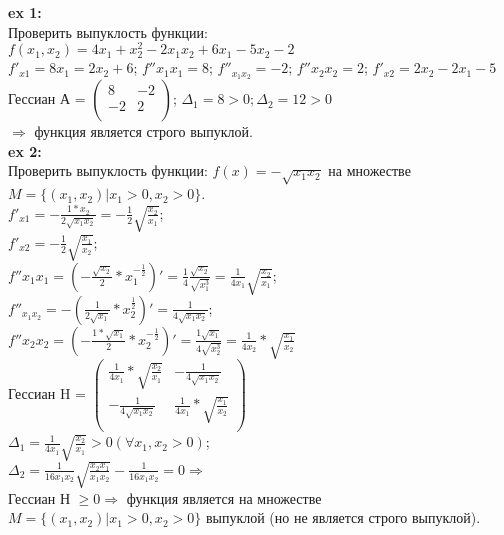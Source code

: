 \textbf{ex 1:} \\
Проверить выпуклость функции: \\
$f(x_1, x_2) = 4x_1 + x_2^2 - 2x_1x_2 + 6x_1 - 5x_2 - 2$ \\
$f'_{x1} = 8x_1 =2x_2 + 6$;
$f''{x_1x_1} = 8$;
$f''_{x_1x_2} = -2$;
$f''{x_2x_2} = 2$;
$f'_{x2} = 2x_2 - 2x_1 - 5$ \\
Гессиан А =
$
\begin{pmatrix}
8 & -2 \\
-2 & 2 \\
\end{pmatrix}
$;
$\Delta_1 = 8 > 0; \Delta_2 = 12 > 0$ \\
$\Rightarrow$ функция является строго выпуклой. \\
\textbf{ex 2:} \\
Проверить выпуклость функции: 
$f(x) = -\sqrt{x_1x_2}$ на множестве \\
$M = \{ (x_1, x_2)| x_1 > 0, x_2 > 0\}$. \\
$f'_{x1} = -\frac{1 * x_2}{2 \sqrt{x_1 x_2}} = - \frac{1}{2} \sqrt{\frac{x_2}{x_1}}$; \\
$f'_{x2} = - \frac{1}{2} \sqrt{\frac{x_1}{x_2}}$; \\
$f''{x_1x_1} = (- \frac{\sqrt{x_2}}{2} * x_1^{-\frac{1}{2}})' = \frac{1}{4} \frac{\sqrt{x_2}}{\sqrt{x_1^3}} = \frac{1}{4 x_1} \sqrt{\frac{x_2}{x_1}}$; \\
$f''_{x_1x_2} = - (\frac{1}{2 \sqrt{x_1}} * x_2^{\frac{1}{2}})' = \frac{1}{4 \sqrt{x_1 x_2}}$; \\
$f''{x_2x_2} = (- \frac{1 * \sqrt{x_1}}{2} * x_2^{- \frac{1}{2}})' = \frac{1 \sqrt{x_1}}{4 \sqrt{x_2^3}} = \frac{1}{4x_2} * \sqrt{\frac{x_1}{x_2}}$ \\
Гессиан H =
$\begin{pmatrix}
\frac{1}{4x_1} * \sqrt{\frac{x_2}{x_1}} & - \frac{1}{4 \sqrt{x_1 x_2}} \\
- \frac{1}{4 \sqrt{x_1 x_2}} & \frac{1}{4x_1} * \sqrt{\frac{x_1}{x_2}} \\
\end{pmatrix}$ \\
$\Delta_1 = \frac{1}{4x_1} \sqrt{\frac{x_2}{x_1}} > 0 (\forall x_1, x_2 > 0)$; \\
$\Delta_2 = \frac{1}{16 x_1 x_2} \sqrt{\frac{x_2 x_1}{x_1 x_2}} - \frac{1}{16 x_1 x_2} = 0 \Rightarrow$ \\
Гессиан Н $\geqslant 0 \Rightarrow$ функция является на множестве $M = \{ (x_1, x_2) | x_1 > 0, x_2 >0 \}$ выпуклой (но не является строго выпуклой).

